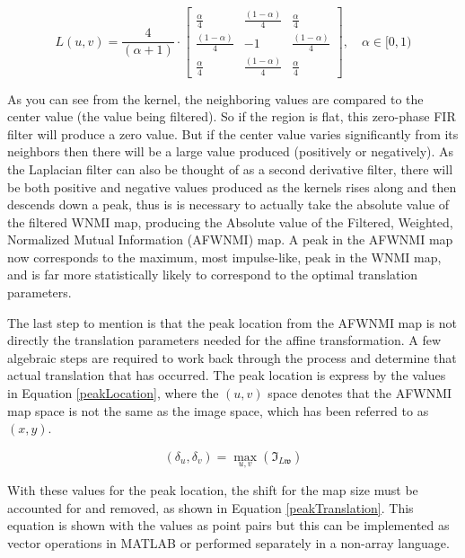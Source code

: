 \begin{equation}
\label{laplacianFilter}
	L(u,v)=\frac{4}{(\alpha + 1)} \cdot
	\begin{bmatrix}
		\frac{\alpha}{4} & \frac{(1-\alpha)}{4} & \frac{\alpha}{4} \\
		\frac{(1-\alpha)}{4} & -1 & \frac{(1-\alpha)}{4} \\
		\frac{\alpha}{4} & \frac{(1-\alpha)}{4} & \frac{\alpha}{4}
	\end{bmatrix}, \quad \alpha \in [0,1)
\end{equation}


As you can see from the kernel, the neighboring values are compared to the center value (the value being filtered). So if the region is flat, this zero-phase FIR filter will produce a zero value. But if the center value varies significantly from its neighbors then there will be a large value produced (positively or negatively). As the Laplacian filter can also be thought of as a second derivative filter, there will be both positive and negative values produced as the kernels rises along and then descends down a peak, thus is is necessary to actually take the absolute value of the filtered WNMI map, producing the Absolute value of the Filtered, Weighted, Normalized Mutual Information (AFWNMI) map. A peak in the AFWNMI map now corresponds to the maximum, most impulse-like, peak in the WNMI map, and is far more statistically likely to correspond to the optimal translation parameters.


The last step to mention is that the peak location from the AFWNMI map is not directly the translation parameters needed for the affine transformation. A few algebraic steps are required to work back through the process and determine that actual translation that has occurred. The peak location is express by the values in Equation \ref{peakLocation}, where the $(u,v)$ space denotes that the AFWNMI map space is not the same as the image space, which has been referred to as $(x,y)$.

\begin{equation}
\label{peakLocation}
	(\delta_{u},\delta_{v})=\max_{u,v}\left(\mathfrak{I}_{L\mathfrak{w}}\right)
\end{equation}

\noindent With these values for the peak location, the shift for the map size must be accounted for and removed, as shown in Equation \ref{peakTranslation}. This equation is shown with the values as point pairs but this can be implemented as vector operations in MATLAB\textsuperscript{\textregistered} or performed separately in a non-array language.

